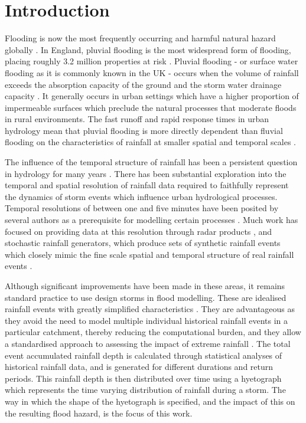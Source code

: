 \documentclass[APA,Times2COL]{WileyNJDv5}
\begin{document}
\section{Introduction}\label{sec:introduction}

Flooding is now the most frequently occurring and harmful natural hazard globally \citep{jenkins2018probabilistic, razavi2020anthropocene}. In England, pluvial flooding is the most widespread form of flooding, placing roughly 3.2 million properties at risk \citep{envagency2021}. Pluvial flooding - or surface water flooding as it is commonly known in the UK - occurs when the volume of rainfall exceeds the absorption capacity of the ground and the storm water drainage capacity \citep{archer_characterising_2015}. It generally occurs in urban settings which have a higher proportion of impermeable surfaces which preclude the natural processes that moderate floods in rural environments. The fast runoff and rapid response times in urban hydrology mean that pluvial flooding is more directly dependent than fluvial flooding on the characteristics of rainfall at smaller spatial and temporal scales \citep{ochoa2015impact, peleg2016partitioning}.

The influence of the temporal structure of rainfall has been a persistent question in hydrology for many years \citep{dawdy1969effect, singh1997effect, woods1999synthesis}. There has been substantial exploration into the temporal and spatial resolution of rainfall data required to faithfully represent the dynamics of storm events which influence urban hydrological processes. Temporal resolutions of between one and five minutes have been posited by several authors as a prerequisite for modelling certain processes \citep{schilling1991rainfall, einfalt2004towards, berne2013radar}. Much work has focused on providing data at this resolution through radar products \citep{einfalt2004towards, thorndahl2017weather, bruni2015sensitivity}, and stochastic rainfall generators, which produce sets of synthetic rainfall events which closely mimic the fine scale spatial and temporal structure of real rainfall events \citep{peleg2016partitioning, zhu2018impact, paschalis2014effects, gabellani2007propagation}. 

Although significant improvements have been made in these areas, it remains standard practice to use design storms in flood modelling. These are idealised rainfall events with greatly simplified characteristics \citep{butler_urban_2004}. They are advantageous as they avoid the need to model multiple individual historical rainfall events in a particular catchment, thereby reducing the computational burden, and they allow a standardised approach to assessing the impact of extreme rainfall \citep{marsalek1984design, balbastre2019comparison}. The total event accumulated rainfall depth is calculated through statistical analyses of historical rainfall data, and is generated for different durations and return periods. This rainfall depth is then distributed over time using a hyetograph which represents the time varying distribution of rainfall during a storm. The way in which the shape of the hyetograph is specified, and the impact of this on the resulting flood hazard, is the focus of this work.
\end{document}
